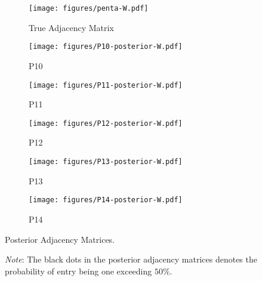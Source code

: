 \begin{figure}[t]
	\centering
	\begin{subfigure}{0.31\textwidth}
		\centering
		\texttt{[image: figures/penta-W.pdf]}
		\caption{True Adjacency Matrix}
	\end{subfigure}
	\begin{subfigure}{0.31\textwidth}
		\centering
		\texttt{[image: figures/P10-posterior-W.pdf]}
		\caption{P10}
	\end{subfigure}
	\begin{subfigure}{0.31\textwidth}
		\centering
		\texttt{[image: figures/P11-posterior-W.pdf]}
		\caption{P11}
	\end{subfigure}
	\begin{subfigure}{0.31\textwidth}
		\centering
		\texttt{[image: figures/P12-posterior-W.pdf]}
		\caption{P12}
	\end{subfigure}
	\begin{subfigure}{0.31\textwidth}
		\centering
		\texttt{[image: figures/P13-posterior-W.pdf]}
		\caption{P13}
	\end{subfigure}
	\begin{subfigure}{0.31\textwidth}
		\centering
		\texttt{[image: figures/P14-posterior-W.pdf]}
		\caption{P14}
	\end{subfigure}
	\caption{Posterior Adjacency Matrices.}
	\label{fig:P1}
	\caption*{\footnotesize\emph{Note}: The black dots in the posterior adjacency matrices denotes the probability of entry being one exceeding $50\%$.}
\end{figure}
